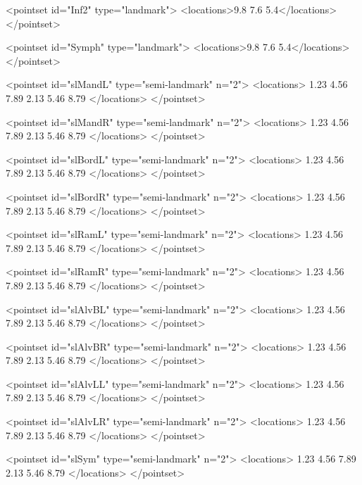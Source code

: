 \begin{DoxyVerbInclude}
<pointset id="Inf2" type="landmark">
<locations>9.8 7.6 5.4</locations>
</pointset>

<pointset id="Symph" type="landmark">
<locations>9.8 7.6 5.4</locations>
</pointset>

<pointset id="slMandL" type="semi-landmark" n="2">
<locations>
1.23 4.56 7.89
2.13 5.46 8.79
</locations>
</pointset>

<pointset id="slMandR" type="semi-landmark" n="2">
<locations>
1.23 4.56 7.89
2.13 5.46 8.79
</locations>
</pointset>

<pointset id="slBordL" type="semi-landmark" n="2">
<locations>
1.23 4.56 7.89
2.13 5.46 8.79
</locations>
</pointset>

<pointset id="slBordR" type="semi-landmark" n="2">
<locations>
1.23 4.56 7.89
2.13 5.46 8.79
</locations>
</pointset>

<pointset id="slRamL" type="semi-landmark" n="2">
<locations>
1.23 4.56 7.89
2.13 5.46 8.79
</locations>
</pointset>

<pointset id="slRamR" type="semi-landmark" n="2">
<locations>
1.23 4.56 7.89
2.13 5.46 8.79
</locations>
</pointset>

<pointset id="slAlvBL" type="semi-landmark" n="2">
<locations>
1.23 4.56 7.89
2.13 5.46 8.79
</locations>
</pointset>

<pointset id="slAlvBR" type="semi-landmark" n="2">
<locations>
1.23 4.56 7.89
2.13 5.46 8.79
</locations>
</pointset>

<pointset id="slAlvLL" type="semi-landmark" n="2">
<locations>
1.23 4.56 7.89
2.13 5.46 8.79
</locations>
</pointset>

<pointset id="slAlvLR" type="semi-landmark" n="2">
<locations>
1.23 4.56 7.89
2.13 5.46 8.79
</locations>
</pointset>

<pointset id="slSym" type="semi-landmark" n="2">
<locations>
1.23 4.56 7.89
2.13 5.46 8.79
</locations>
</pointset>


\end{DoxyVerbInclude}
